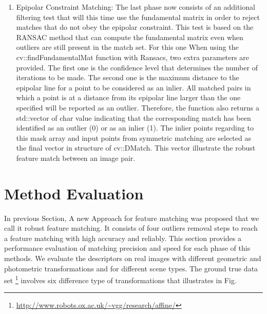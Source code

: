 \begin {enumerate}
  \item Epipolar Constraint Matching: The last phase now consists of an additional filtering test that will this time use the fundamental matrix in order to reject matches that do not obey the epipolar constraint. This test is based on the RANSAC method that can compute the fundamental matrix even when outliers are still present in the match set. For this one When using the cv::findFundamentalMat function with Ransacs, two extra parameters are provided. The first one is the confidence level that determines the number of iterations to be made. The second one is the maximum distance to the epipolar line for a point to be considered as an inlier. All matched pairs in which a point is at a distance from its epipolar line larger than the one specified will be reported as an outlier. Therefore, the function also returns a std::vector of char value indicating that the corresponding match has been identified as an outlier (0) or as an inlier (1). The inlier points regarding to this mask array and input points from symmetric matching are selected as the final vector in structure of cv::DMatch. This vector illustrate the robust feature match between an image pair.
\end {enumerate}

\section {Method Evaluation}
In previous Section, A new Approach for feature matching was proposed that we call it robust feature matching. It consists of four outliers removal steps to reach a feature matching with high accuracy and reliably. This section provides a performance evaluation of matching precision and speed for each phase of this methods. We evaluate the descriptors on real images with different geometric and photometric transformations and for different scene types. The ground true data set \footnote {\url{http://www.robots.ox.ac.uk/~vgg/research/affine/}} involves six difference type of transformations that illustrates in Fig.

